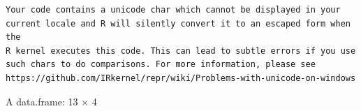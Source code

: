 \documentclass[
  letterpaper,
  DIV=11,
  numbers=noendperiod]{scrreprt}
\newenvironment{Shaded}{\begin{snugshade}}{\end{snugshade}}
\newcommand{\AttributeTok}[1]{\textcolor[rgb]{0.40,0.45,0.13}{#1}}
\newcommand{\CommentTok}[1]{\textcolor[rgb]{0.37,0.37,0.37}{#1}}
\newcommand{\FunctionTok}[1]{\textcolor[rgb]{0.28,0.35,0.67}{#1}}
\newcommand{\NormalTok}[1]{\textcolor[rgb]{0.00,0.23,0.31}{#1}}
\newcommand{\OtherTok}[1]{\textcolor[rgb]{0.00,0.23,0.31}{#1}}
\newcommand{\SpecialCharTok}[1]{\textcolor[rgb]{0.37,0.37,0.37}{#1}}
\begin{document}
\begin{Shaded}
\end{Shaded}

\begin{verbatim}
Your code contains a unicode char which cannot be displayed in your
current locale and R will silently convert it to an escaped form when the
R kernel executes this code. This can lead to subtle errors if you use
such chars to do comparisons. For more information, please see
https://github.com/IRkernel/repr/wiki/Problems-with-unicode-on-windows
\end{verbatim}

A data.frame: 13 × 4
\end{document}
